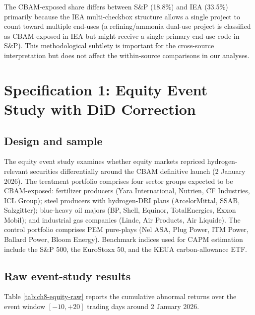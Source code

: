 \documentclass[11pt,a4paper]{article}
\begin{document}
The CBAM-exposed share differs between S\&P (18.8\%) and IEA (33.5\%) primarily because the IEA multi-checkbox structure allows a single project to count toward multiple end-uses (a refining/ammonia dual-use project is classified as CBAM-exposed in IEA but might receive a single primary end-use code in S\&P). This methodological subtlety is important for the cross-source interpretation but does not affect the within-source comparisons in our analyses.

\section{Specification 1: Equity Event Study with DiD Correction}
\label{sec:ch8-equity}

\subsection{Design and sample}

The equity event study examines whether equity markets repriced hydrogen-relevant securities differentially around the CBAM definitive launch (2 January 2026). The treatment portfolio comprises four sector groups expected to be CBAM-exposed: fertilizer producers (Yara International, Nutrien, CF Industries, ICL Group); steel producers with hydrogen-DRI plans (ArcelorMittal, SSAB, Salzgitter); blue-heavy oil majors (BP, Shell, Equinor, TotalEnergies, Exxon Mobil); and industrial gas companies (Linde, Air Products, Air Liquide). The control portfolio comprises PEM pure-plays (Nel ASA, Plug Power, ITM Power, Ballard Power, Bloom Energy). Benchmark indices used for CAPM estimation include the S\&P 500, the EuroStoxx 50, and the KEUA carbon-allowance ETF.

\subsection{Raw event-study results}

Table \ref{tab:ch8-equity-raw} reports the cumulative abnormal returns over the event window $[-10, +20]$ trading days around 2 January 2026.
\end{document}
